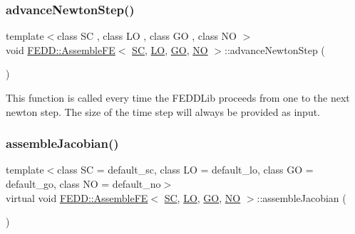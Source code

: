 \subsubsection{\texorpdfstring{advance\+Newton\+Step()}{advanceNewtonStep()}}
{\footnotesize\ttfamily template$<$class SC , class LO , class GO , class NO $>$ \\
void \hyperlink{classFEDD_1_1AssembleFE}{F\+E\+D\+D\+::\+Assemble\+FE}$<$ \hyperlink{fe__test__laplace_8cpp_a79c7e86a57edbb2a5a53242bcd04e41e}{SC}, \hyperlink{fe__test__laplace_8cpp_ad6a38c9f07d3fd633eefca5bccad8410}{LO}, \hyperlink{fe__test__laplace_8cpp_afa2946b509009b4f45eb04bd8c5b27d9}{GO}, \hyperlink{fe__test__laplace_8cpp_a5e24f37b28787429872b6ecb1d0417ce}{NO} $>$\+::advance\+Newton\+Step (\begin{DoxyParamCaption}{ }\end{DoxyParamCaption})}



This function is called every time the F\+E\+D\+D\+Lib proceeds from one to the next newton step. The size of the time step will always be provided as input. 

\mbox{\label{classFEDD_1_1AssembleFE_af48b450dfdf6cea7beeb24feef7dc10f}} 
\subsubsection{\texorpdfstring{assemble\+Jacobian()}{assembleJacobian()}}
{\footnotesize\ttfamily template$<$class SC  = default\+\_\+sc, class LO  = default\+\_\+lo, class GO  = default\+\_\+go, class NO  = default\+\_\+no$>$ \\
virtual void \hyperlink{classFEDD_1_1AssembleFE}{F\+E\+D\+D\+::\+Assemble\+FE}$<$ \hyperlink{fe__test__laplace_8cpp_a79c7e86a57edbb2a5a53242bcd04e41e}{SC}, \hyperlink{fe__test__laplace_8cpp_ad6a38c9f07d3fd633eefca5bccad8410}{LO}, \hyperlink{fe__test__laplace_8cpp_afa2946b509009b4f45eb04bd8c5b27d9}{GO}, \hyperlink{fe__test__laplace_8cpp_a5e24f37b28787429872b6ecb1d0417ce}{NO} $>$\+::assemble\+Jacobian (\begin{DoxyParamCaption}{ }\end{DoxyParamCaption})\hspace{0.3cm}{\ttfamily [pure virtual]}}




